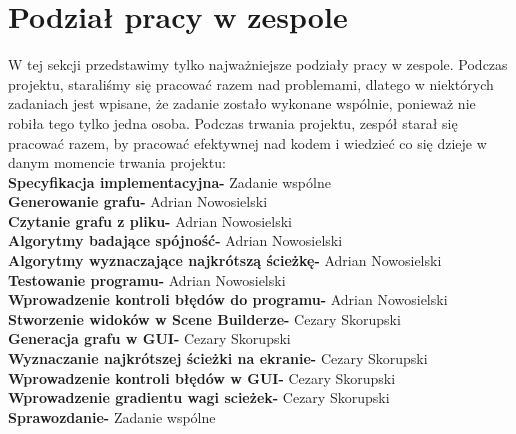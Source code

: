 \documentclass[10pt]{article}
\begin{document}
\section{Podział pracy w zespole}
W tej sekcji przedstawimy tylko najważniejsze podziały pracy w zespole. Podczas projektu, staraliśmy się pracować razem nad problemami, dlatego w niektórych zadaniach jest wpisane, że zadanie zostało wykonane wspólnie, ponieważ nie robiła tego tylko jedna osoba. Podczas trwania projektu, zespół starał się pracować razem, by pracować efektywnej nad kodem i wiedzieć co się dzieje w danym momencie trwania projektu:\\
\textbf{Specyfikacja implementacyjna-} Zadanie wspólne\\
\textbf{Generowanie grafu-} Adrian Nowosielski\\
\textbf{Czytanie grafu z pliku-} Adrian Nowosielski\\
\textbf{Algorytmy badające spójność-} Adrian Nowosielski\\
\textbf{Algorytmy wyznaczające najkrótszą ścieżkę-} Adrian Nowosielski\\
\textbf{Testowanie programu-} Adrian Nowosielski\\
\textbf{Wprowadzenie kontroli błędów do programu-} Adrian Nowosielski\\
\textbf{Stworzenie widoków w Scene Builderze-} Cezary Skorupski\\
\textbf{Generacja grafu w GUI-} Cezary Skorupski\\
\textbf{Wyznaczanie najkrótszej ścieżki na ekranie-} Cezary Skorupski\\
\textbf{Wprowadzenie kontroli błędów w GUI-} Cezary Skorupski\\
\textbf{Wprowadzenie gradientu wagi scieżek-} Cezary Skorupski\\
\textbf{Sprawozdanie-} Zadanie wspólne
\newpage
\end{document}

